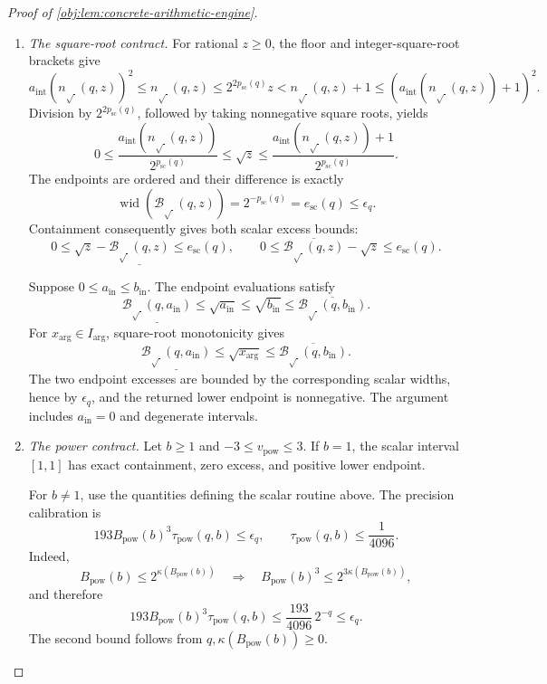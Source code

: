 \begin{proof}[Proof of \cref{obj:lem:concrete-arithmetic-engine}]
\begin{enumerate}
\item \emph{The square-root contract.}
For rational \(z\ge0\), the floor and integer-square-root brackets give
\[
a_{\mathrm{int}}(n_{\sqrt{\ }}(q,z))^2
 \le n_{\sqrt{\ }}(q,z)
 \le2^{2p_{\mathrm{sc}}(q)}z
 <n_{\sqrt{\ }}(q,z)+1
 \le(a_{\mathrm{int}}(n_{\sqrt{\ }}(q,z))+1)^2.
\]
Division by \(2^{2p_{\mathrm{sc}}(q)}\), followed by taking nonnegative square roots, yields
\[
0\le
\frac{a_{\mathrm{int}}(n_{\sqrt{\ }}(q,z))}
     {2^{p_{\mathrm{sc}}(q)}}
 \le\sqrt z\le
\frac{a_{\mathrm{int}}(n_{\sqrt{\ }}(q,z))+1}
     {2^{p_{\mathrm{sc}}(q)}}.
\]
The endpoints are ordered and their difference is exactly
\[
\operatorname{wid}(\mathcal B_{\sqrt{\ }}(q,z))
 =2^{-p_{\mathrm{sc}}(q)}
 =e_{\mathrm{sc}}(q)\le\epsilon_q.
\]
Containment consequently gives both scalar excess bounds:
\[
0\le\sqrt z-\underline{\mathcal B_{\sqrt{\ }}(q,z)}
 \le e_{\mathrm{sc}}(q),
\qquad
0\le\overline{\mathcal B_{\sqrt{\ }}(q,z)}-\sqrt z
 \le e_{\mathrm{sc}}(q).
\]

Suppose \(0\le a_{\mathrm{in}}\le b_{\mathrm{in}}\). The endpoint evaluations satisfy
\[
\underline{\mathcal B_{\sqrt{\ }}(q,a_{\mathrm{in}})}
 \le\sqrt{a_{\mathrm{in}}}
 \le\sqrt{b_{\mathrm{in}}}
 \le\overline{\mathcal B_{\sqrt{\ }}(q,b_{\mathrm{in}})}.
\]
For \(x_{\mathrm{arg}}\in I_{\mathrm{arg}}\), square-root monotonicity gives
\[
\underline{\mathcal B_{\sqrt{\ }}(q,a_{\mathrm{in}})}
 \le\sqrt{x_{\mathrm{arg}}}
 \le\overline{\mathcal B_{\sqrt{\ }}(q,b_{\mathrm{in}})}.
\]
The two endpoint excesses are bounded by the corresponding scalar widths, hence by \(\epsilon_q\), and the returned lower endpoint is nonnegative. The argument includes \(a_{\mathrm{in}}=0\) and degenerate intervals.

\item \emph{The power contract.}
Let \(b\ge1\) and \(-3\le v_{\mathrm{pow}}\le3\). If \(b=1\), the scalar interval
\([1,1]\) has exact containment, zero excess, and positive lower endpoint.

For \(b\ne1\), use the quantities defining the scalar routine above. The precision calibration is
\[
193B_{\mathrm{pow}}(b)^3\tau_{\mathrm{pow}}(q,b)
 \le\epsilon_q,
\qquad
\tau_{\mathrm{pow}}(q,b)\le\frac1{4096}.
\]
Indeed,
\[
B_{\mathrm{pow}}(b)\le2^{\kappa(B_{\mathrm{pow}}(b))}
\quad\Longrightarrow\quad
B_{\mathrm{pow}}(b)^3
 \le2^{3\kappa(B_{\mathrm{pow}}(b))},
\]
and therefore
\[
193B_{\mathrm{pow}}(b)^3\tau_{\mathrm{pow}}(q,b)
 \le\frac{193}{4096}\,2^{-q}\le\epsilon_q.
\]
The second bound follows from \(q,\kappa(B_{\mathrm{pow}}(b))\ge0\).


\end{enumerate}
\end{proof}

